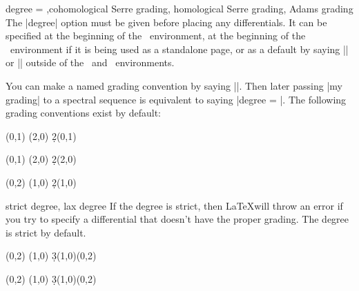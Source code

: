 \begin{sseqdata}[|| name = ex1, cohomological Serre grading]
\begin{keylist}{degree = ,cohomological Serre grading, homological Serre grading, Adams grading}
The |degree| option must be given before placing any differentials. It can be specified at the beginning of the \sseqdataenv\  environment, at the beginning of the \sseqpageenv\  environment if it is being used as a standalone page, or as a default by saying || or || outside of the \sseqdataenv\  and \sseqpages\  environments.

You can make a named grading convention by saying \codeverb||. Then later passing |my grading| to a spectral sequence is equivalent to saying |degree = |. The following grading conventions exist by default:
\begin{codeexample}[width = 6cm]
\begin{sseqpage}
\class(0,1)
\class(2,0)
\d2(0,1)
\end{sseqpage}
\end{codeexample}
\begin{codeexample}[width = 6cm]
\begin{sseqpage}
\class(0,1)
\class(2,0)
\d2(2,0)
\end{sseqpage}
\end{codeexample}
\begin{codeexample}[width = 6cm]
\begin{sseqpage}
\class(0,2)
\class(1,0)
\d2(1,0)
\end{sseqpage}
\end{codeexample}
\end{keylist}

\begin{keylist}{strict degree, lax degree}
If the degree is strict, then \LaTeX will throw an error if you try to specify a differential that doesn't have the proper grading. The degree is strict by default.
\begin{codeexample}
\begin{sseqdata}[ name = laxdegree, Adams grading ]
\class(0,2)
\class(1,0)
\d3(1,0)(0,2) %
\end{sseqdata}
\end{codeexample}

\begin{codeexample}[]
\begin{sseqdata}[ name = laxdegree, Adams grading, lax degree, yscale = 0.6 ]
\class(0,2)
\class(1,0)
\d3(1,0)(0,2) %
\end{sseqdata}
\printpage[ name = laxdegree, page = 3 ]
\end{codeexample}
\end{keylist}


\end{sseqdata}
